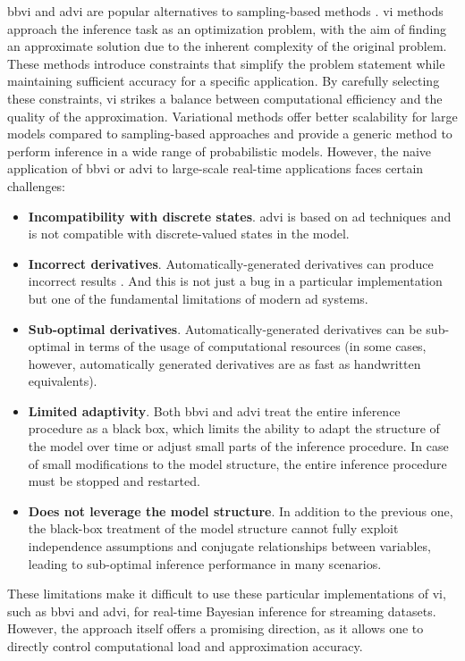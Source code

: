 \Ac{bbvi} and \ac{advi} are popular alternatives to sampling-based methods \citep{ranganath_black_2014, kucukelbir_automatic_2017}.
\Ac{vi} methods approach the inference task as an optimization problem, with the aim of finding an approximate solution due to the inherent complexity of the original problem. These methods introduce constraints that simplify the problem statement while maintaining sufficient accuracy for a specific application. By carefully selecting these constraints, \ac{vi} strikes a balance between computational efficiency and the quality of the approximation.
Variational methods offer better scalability for large models compared to sampling-based approaches and provide a generic method to perform inference in a wide range of probabilistic models.
However, the naive application of \ac{bbvi} or \ac{advi} to large-scale real-time applications faces certain challenges:
\begin{itemize}
    \item \textbf{Incompatibility with discrete states}. \ac{advi} is based on \ac{ad} techniques and is not compatible with discrete-valued states in the model.
    \item \textbf{Incorrect derivatives}. Automatically-generated derivatives can produce incorrect results \citep{beck_if-problem_1994}. And this is not just a bug in a particular implementation but one of the fundamental limitations of modern \ac{ad} systems.
    \item \textbf{Sub-optimal derivatives}. Automatically-generated derivatives can be sub-optimal in terms of the usage of computational resources (in some cases, however, automatically generated derivatives are as fast as handwritten equivalents).
    \item \textbf{Limited adaptivity}. Both \ac{bbvi} and \ac{advi} treat the entire inference procedure as a black box, which limits the ability to adapt the structure of the model over time or adjust small parts of the inference procedure. In case of small modifications to the model structure, the entire inference procedure must be stopped and restarted.
    \item \textbf{Does not leverage the model structure}. In addition to the previous one, the black-box treatment of the model structure cannot fully exploit independence assumptions and conjugate relationships between variables, leading to sub-optimal inference performance in many scenarios.
\end{itemize}

These limitations make it difficult to use these particular implementations of \ac{vi}, such as \ac{bbvi} and \ac{advi}, for real-time Bayesian inference for streaming datasets. However, the approach itself offers a promising direction, as it allows one to directly control computational load and approximation accuracy. 

